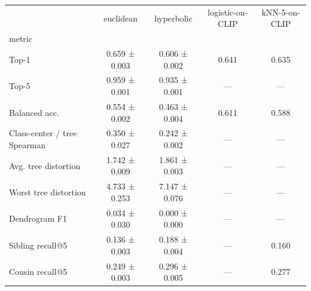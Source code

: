 \begin{tabular}{lcccc}
\toprule
 & euclidean & hyperbolic & logistic-on-CLIP & kNN-5-on-CLIP \\
metric &  &  &  &  \\
\midrule
Top-1 & 0.659 ± 0.003 & 0.606 ± 0.002 & 0.641 & 0.635 \\
Top-5 & 0.959 ± 0.001 & 0.935 ± 0.001 & — & — \\
Balanced acc. & 0.554 ± 0.002 & 0.463 ± 0.004 & 0.611 & 0.588 \\
Class-center / tree Spearman & 0.350 ± 0.027 & 0.242 ± 0.002 & — & — \\
Avg. tree distortion & 1.742 ± 0.009 & 1.861 ± 0.003 & — & — \\
Worst tree distortion & 4.733 ± 0.253 & 7.147 ± 0.076 & — & — \\
Dendrogram F1 & 0.034 ± 0.030 & 0.000 ± 0.000 & — & — \\
Sibling recall@5 & 0.136 ± 0.003 & 0.188 ± 0.004 & — & 0.160 \\
Cousin recall@5 & 0.249 ± 0.003 & 0.296 ± 0.005 & — & 0.277 \\
\bottomrule
\end{tabular}
